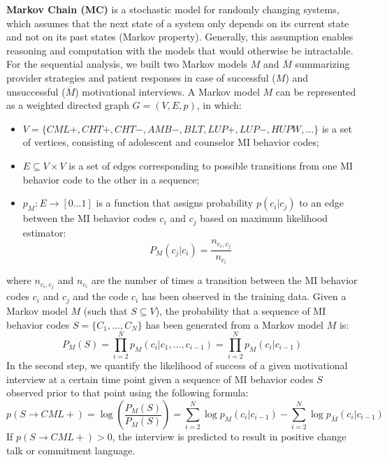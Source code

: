 \documentclass{amia_summit_2018}
\begin{document}
\textbf {Markov Chain (MC)} is a stochastic model for randomly changing systems, which assumes that the next state of a system only depends on its current state and not on its past states (Markov property). Generally, this assumption enables reasoning and computation with the models that would otherwise be intractable. For the sequential analysis, we built two Markov models $M$ and $\overline{M}$ summarizing provider strategies and patient responses in case of successful ($M$) and unsuccessful ($\overline{M}$) motivational interviews. A Markov model $M$ can be represented as a weighted directed graph $G = (V, E, p)$, in which:
\begin{itemize}
\item $V = \{CML+, CHT+, CHT-, AMB-, BLT, LUP+, LUP-, HUPW, ...\}$ is a set of vertices, consisting of adolescent and counselor MI behavior codes;
\item $E \subseteq V \times V$ is a set of edges corresponding to possible transitions from one MI behavior code to the other in a sequence;
\item $p_M:E\rightarrow[0...1]$ is a function that assigns probability $p(c_i|c_j)$ to an edge between the MI behavior codes $c_i$ and $c_j$ based on maximum likelihood estimator:
\begin{equation}
P_M(c_j|c_i) = \frac{n_{c_i,c_j}}{n_{c_i}}
\end{equation}
\end{itemize}
where $n_{c_i,c_j}$ and $n_{c_i}$ are the number of times a transition between the MI behavior codes $c_i$ and $c_j$ and the code $c_i$ has been observed in the training data. Given a Markov model $M$ (such that $S\subseteq V$), the probability that a sequence of MI behavior codes $S = \{C_1,...,C_N\}$ has been generated from a Markov model $M$ is:
\begin{equation}
P_M(S) = \prod_{i=2}^N p_M(c_i|c_1,\dots,c_{i-1})=\prod_{i=2}^N p_M(c_i|c_{i-1})
\end{equation}
In the second step, we quantify the likelihood of success of a given motivational interview at a certain time point given a sequence of MI behavior codes $S$ observed prior to that point using the following formula:
\begin{equation}
p(S\rightarrow CML+) = \log\left(\frac{P_M(S)}{P_{\overline M}(S)}\right)= \sum_{i=2}^N \log p_M(c_i|c_{i-1})-\sum_{i=2}^N \log p_{\overline M}(c_i|c_{i-1})\label{eq:class}
\end{equation}
If $p(S\rightarrow CML+) > 0 $, the interview is predicted to result in positive change talk or commitment language. 
\end{document}
